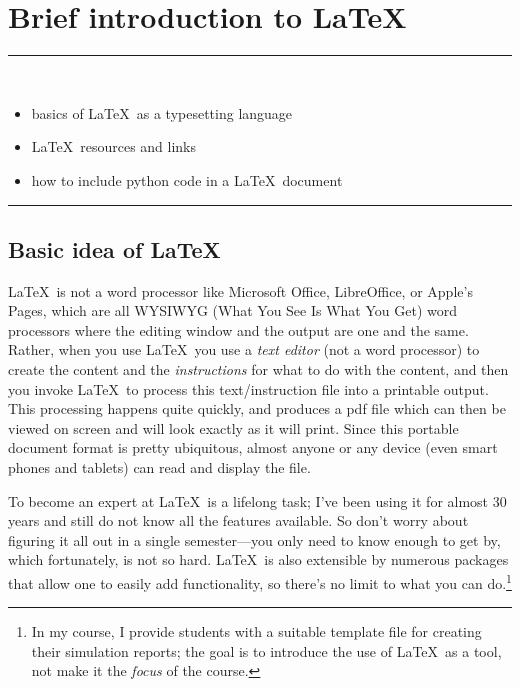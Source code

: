 \chapter{Brief introduction to \LaTeX\ }
\label{assignment:01} 

\begin{flushright}
	\parbox{8cm}
		{
		\begin{flushright}%
		\rule{8cm}{0.75pt}\\
		\vspace*{5mm}
		\begin{itemize}\color[RGB]{0,128,128}
		\item basics of \LaTeX\ as a typesetting language 
		\item \LaTeX\ resources and links
		\item how to include python code in a \LaTeX\ document
		\end{itemize}
		\vspace*{5mm}
		\rule{8cm}{0.75pt}
		\end{flushright}
		}
\end{flushright}

\section{Basic idea of \LaTeX\ }\label{sec:basic}
\LaTeX\ is not a word processor like Microsoft Office, LibreOffice, or Apple's Pages, which are all WYSIWYG (What You See Is What You Get) word processors where the editing window and the output are one and the same. Rather, when you use \LaTeX\, you use a \textit{text editor} (not a word processor) to create the content and the \textit{instructions} for what to do with the content, and then you invoke \LaTeX\ to process this text/instruction file into a printable output. This processing happens quite quickly, and produces a pdf file which can then be viewed on screen and will look exactly as it will print. Since this portable document format is pretty ubiquitous, almost anyone or any device (even smart phones and tablets) can read and display the file. 


To become an expert at \LaTeX\ is a lifelong task; I've been using it for almost 30 years and still do not know all the features available. So don't worry about figuring it all out in a single semester---you only need to know enough to get by, which fortunately, is not so hard. \LaTeX\ is also extensible by numerous packages that allow one to easily add functionality, so there's no limit to what you can do.\footnote{In my course, I provide students with a suitable template file for creating their simulation reports; the goal is to introduce the use of \LaTeX\ as a tool, not make it the \textit{focus} of the course.}

